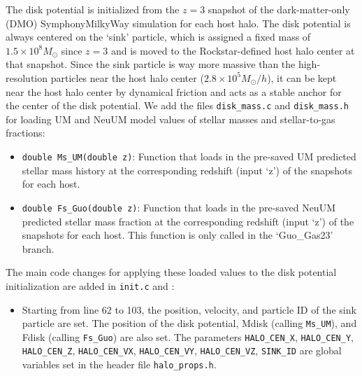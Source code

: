 \documentclass[12pt]{article}
\begin{document}
    The disk potential is initialized from the $z=3$ snapshot of the dark-matter-only (DMO) SymphonyMilkyWay simulation for each host halo. The disk potential is always centered on the `sink' particle, which is assigned a fixed mass of $1.5 \times 10^8 M_{\odot}$ since $z=3$ and is moved to the Rockstar-defined host halo center at that snapshot. Since the sink particle is way more massive than the high-resolution particles near the host halo center ($2.8 \times 10^5 M_{\odot}/h$), it can be kept near the host halo center by dynamical friction and acts as a stable anchor for the center of the disk potential. We add the files \texttt{disk\_mass.c} and \texttt{disk\_mass.h} for loading UM and NeuUM model values of stellar masses and stellar-to-gas fractions: 
    \begin{itemize}
        \item \texttt{double Ms\_UM(double z)}: Function that loads in the pre-saved UM predicted stellar mass history at the corresponding redshift (input `z') of the snapshots for each host.
        \item \texttt{double Fs\_Guo(double z)}: Function that loads in the pre-saved NeuUM predicted stellar mass fraction at the corresponding redshift (input `z') of the snapshots for each host. This function is only called in the `Guo\_Gas23' branch.
    \end{itemize}
    The main code changes for applying these loaded values to the disk potential initialization are added in \texttt{init.c} and :
    \begin{itemize}
        \item Starting from line 62 to 103, the position, velocity, and particle ID of the sink particle are set. The position of the disk potential, Mdisk (calling \texttt{Ms\_UM}), and Fdisk (calling \texttt{Fs\_Guo}) are also set. The parameters \texttt{HALO\_CEN\_X}, \texttt{HALO\_CEN\_Y}, \texttt{HALO\_CEN\_Z}, \texttt{HALO\_CEN\_VX}, \texttt{HALO\_CEN\_VY}, \texttt{HALO\_CEN\_VZ}, \texttt{SINK\_ID} are global variables set in the header file \texttt{halo\_props.h}.
    \end{itemize}
\end{document}

